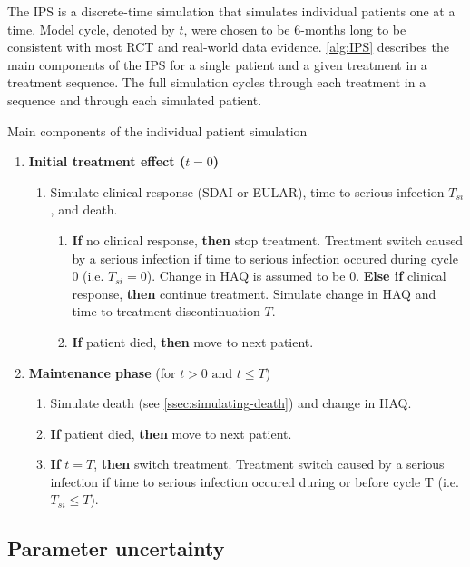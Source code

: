 \documentclass[11pt,final,fleqn]{article}\usepackage[]{graphicx}\usepackage[]{color}
\theoremstyle{plain}
\begin{document}
The IPS is a discrete-time simulation that simulates individual patients one at a time. Model cycle, denoted by $t$, were chosen to be 6-months long to be consistent with most RCT and real-world data evidence. \autoref{alg:IPS} describes the main components of the IPS for a single patient and a given treatment in a treatment sequence. The full simulation cycles through each treatment in a sequence and through each simulated patient.

\begin{algorithm}
\caption{Main components of the individual patient simulation}
\label{alg:IPS}
\begin{enumerate}
\item \textbf{Initial treatment effect ($t = 0$)}
\begin{enumerate}
\item Simulate clinical response (SDAI or EULAR), time to serious infection $T_{si}$, and death.
\begin{enumerate}
\item \textbf{If} no clinical response, \textbf{then} stop treatment. Treatment switch caused by a serious infection if time to serious infection occured during cycle 0 (i.e. $T_{si} = 0$). Change in HAQ is assumed to be $0$. 
\newline \textbf{Else if} clinical response, \textbf{then} continue treatment. Simulate change in HAQ and time to treatment discontinuation $T$.
\item \textbf{If} patient died, \textbf{then} move to next patient. 
\end{enumerate}
\end{enumerate}
\item \textbf{Maintenance phase} (for $t > 0 \text{ and } t \leq T$)
\begin{enumerate}
\item Simulate death (see \autoref{ssec:simulating-death}) and change in HAQ.
\item \textbf{If} patient died, \textbf{then} move to next patient.
\item \textbf{If} $t = T$, \textbf{then} switch treatment. Treatment switch caused by a serious infection if time to serious infection occured during or before cycle T (i.e. $T_{si} \leq T$). 
\end{enumerate}
\end{enumerate}
\end{algorithm}

\subsection{Parameter uncertainty}\label{parameter-uncertainty}
\end{document}
